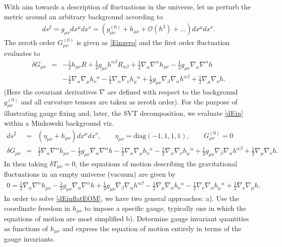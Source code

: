 \documentclass[10pt,letterpaper]{article}
\numberwithin{equation}{section}
\begin{document}
With aim towards a description of fluctuations in the universe, let us perturb the metric around an arbitrary background according to
\begin{eqnarray}
ds^2=g_{\mu\nu}dx^\mu dx^\nu = (g^{(0)}_{\mu\nu} + h_{\mu\nu} + \mathcal O(h^2)+ ...)dx^\mu dx^\nu.
\end{eqnarray}
The zeroth order $G_{\mu\nu}^{(0)}$ is given as \eqref{Einzero} and the first order fluctuation evaluates to 
\begin{eqnarray}
\delta G_{\mu\nu} &=& 
- \tfrac{1}{2} h_{\mu \nu } R + \tfrac{1}{2} g_{\mu \nu } h^{\alpha \beta } R_{\alpha \beta } + \tfrac{1}{2} \nabla_{\alpha }\nabla^{\alpha }h_{\mu \nu } -  \tfrac{1}{2} g_{\mu \nu } \nabla_{\alpha }\nabla^{\alpha }h \nonumber\\
&& -  \tfrac{1}{2} \nabla_{\alpha }\nabla_{\mu }h_{\nu }{}^{\alpha } -  \tfrac{1}{2} \nabla_{\alpha }\nabla_{\nu }h_{\mu }{}^{\alpha } + \tfrac{1}{2} g_{\mu \nu } \nabla_{\beta }\nabla_{\alpha }h^{\alpha \beta } + \tfrac{1}{2} \nabla_{\mu }\nabla_{\nu }h.
\label{dEin}
\end{eqnarray}
(Here the covariant derivatives $\nabla$ are defined with respect to the background $g_{\mu\nu}^{(0)}$ and all curvature tensors are taken as zeroth order). For the purpose of illustrating gauge fixing and, later, the SVT decomposition, we evaluate \eqref{dEin} within a Minkowski background viz.
\begin{eqnarray}
ds^2 &=& (\eta_{\mu\nu} + h_{\mu\nu})dx^\mu dx^\nu, \qquad \eta_{\mu\nu} = \text{diag}(-1,1,1,1),\qquad G^{(0)}_{\mu\nu} = 0
\nonumber\\
\delta G_{\mu\nu} &=& \tfrac{1}{2} \nabla_{\alpha }\nabla^{\alpha }h_{\mu \nu } -  \tfrac{1}{2} g_{\mu \nu } \nabla_{\alpha }\nabla^{\alpha }h -  \tfrac{1}{2} \nabla_{\alpha }\nabla_{\mu }h_{\nu }{}^{\alpha } -  \tfrac{1}{2} \nabla_{\alpha }\nabla_{\nu }h_{\mu }{}^{\alpha } + \tfrac{1}{2} g_{\mu \nu } \nabla_{\beta }\nabla_{\alpha }h^{\alpha \beta } + \tfrac{1}{2} \nabla_{\mu }\nabla_{\nu }h.
\label{dEinflat}
\end{eqnarray}
In then taking $\delta T_{\mu\nu}=0$, the equations of motion describing the gravitational fluctuations in an empty universe (vacuum) are given by 
\begin{eqnarray}
0=\tfrac{1}{2} \nabla_{\alpha }\nabla^{\alpha }h_{\mu \nu } -  \tfrac{1}{2} g_{\mu \nu } \nabla_{\alpha }\nabla^{\alpha }h + \tfrac{1}{2} g_{\mu \nu } \nabla_{\beta }\nabla_{\alpha }h^{\alpha \beta } -  \tfrac{1}{2} \nabla_{\mu }\nabla_{\alpha }h_{\nu }{}^{\alpha } -  \tfrac{1}{2} \nabla_{\nu }\nabla_{\alpha }h_{\mu }{}^{\alpha } + \tfrac{1}{2} \nabla_{\nu }\nabla_{\mu }h.
\label{dEinflatEOM}
\end{eqnarray}
\indent In order to solve \eqref{dEinflatEOM}, we have two general approaches: a). Use the coordinate freedom in $h_{\mu\nu}$ to impose a specific gauge, typically one in which the equations of motion are most simplified
b). Determine gauge invariant quantities as functions of $h_{\mu\nu}$ and express the equation of motion entirely in terms of the gauge invariants. 
\end{document}
